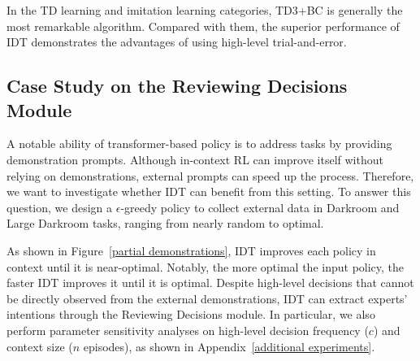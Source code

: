 In the TD learning and imitation learning categories, TD3+BC is generally the most remarkable algorithm. Compared with them, the superior performance of IDT demonstrates the advantages of using high-level trial-and-error.


\subsection{Case Study on the Reviewing Decisions Module}
A notable ability of transformer-based policy is to address tasks by providing demonstration prompts. Although in-context RL can improve itself without relying on demonstrations, external prompts can speed up the process.
Therefore, we want to investigate whether IDT can benefit from this setting. 
To answer this question, we design a $\epsilon$-greedy policy to collect external data in Darkroom and Large Darkroom tasks, ranging from nearly random to optimal.

As shown in Figure~\ref{partial demonstrations}, IDT improves each policy in context until it is near-optimal. Notably, the more optimal the input policy, the faster IDT improves it until it is optimal. Despite high-level decisions that cannot be directly observed from the external demonstrations, IDT can extract experts' intentions through the Reviewing Decisions module. In particular, we also perform parameter sensitivity analyses on high-level decision frequency ($c$) and context size ($n$ episodes), as shown in Appendix~\ref{additional experiments}.



